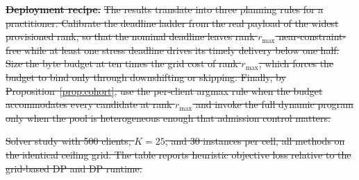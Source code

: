 \documentclass[preprint,12pt]{elsarticle}
\providecommand{\DIFdel}[1]{{\protect\color{red}\sout{#1}}}                      %
\providecommand{\DIFdelFL}[1]{\DIFdel{#1}} %
\begin{document}
\textbf{\DIFdel{Deployment recipe.}} %
\DIFdel{The results translate into three planning rules for a practitioner. Calibrate the deadline ladder from the real payload of the widest provisioned rank, so that the nominal deadline leaves rank $r_{\max}$ near-constraint-free while at least one stress deadline drives its timely delivery below one half. Size the byte budget at ten times the grid cost of rank $r_{\max}$, which forces the budget to bind only through downshifting or skipping. Finally, by Proposition~\ref{prop:cohort}, use the per-client argmax rule when the budget accommodates every candidate at rank $r_{\max}$ and invoke the full dynamic program only when the pool is heterogeneous enough that admission control matters.
}%

{%
\DIFdelFL{Solver study with 500 clients, $K{=}25$, and 30 instances per cell, all methods on the identical ceiling grid. The table reports heuristic objective loss relative to the grid-based DP and DP runtime.}}
\end{document}
